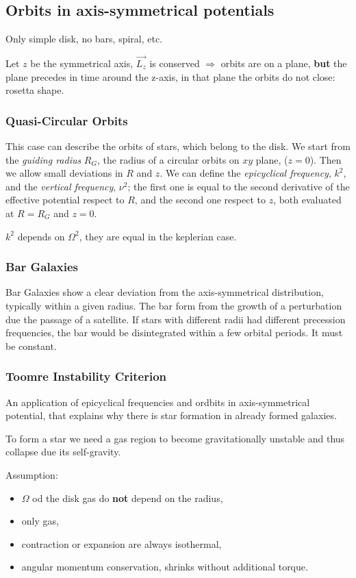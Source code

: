 \documentclass[a4paper,12pt]{article}
\begin{document}
\subsection{Orbits in axis-symmetrical potentials}
Only simple disk, no bars, spiral, etc.

Let $z$ be the symmetrical axis, $\vec{L_z}$ is conserved $\Rightarrow$ orbits are on a plane, \textbf{but} the plane precedes in time around the z-axis, in that plane the orbits do not close: rosetta shape. 


\subsubsection{Quasi-Circular Orbits}
This case can describe the orbits of stars, which belong to the disk. 
We start from the \textit{guiding radius} $R_G$, the radius of a circular orbits on $xy$ plane, ($z=0$). Then we allow small deviations in $R$ and $z$. We can define the \textit{epicyclical frequency}, $k^2$, and the \textit{vertical frequency}, $\nu^2$; the first one is equal to the second derivative of the effective potential respect to $R$, and the second one respect to $z$, both evaluated at $R=R_G$ and $z=0$.

$k^2$ depends on $\Omega^2$, they are equal in the keplerian case.



\subsubsection{Bar Galaxies}
Bar Galaxies show a clear deviation from the axis-symmetrical distribution, typically within a given radius. The bar form from the growth of a perturbation due the passage of a satellite. If stars with different radii had different precession frequencies, the bar would be disintegrated within a few orbital periods. It must be constant. 

\subsubsection{Toomre Instability Criterion}
An application of epicyclical frequencies and ordbits in axis-symmetrical potential, that explains why there is star formation in already formed galaxies.

To form a star we need a gas region to become gravitationally unstable and thus collapse due its self-gravity.
 
Assumption: 

\begin{itemize}
	\item $\Omega$ od the disk gas do \textbf{not} depend on the radius,
	\item only gas, 
	\item contraction or expansion are always isothermal,
	\item angular momentum conservation, shrinks without additional torque.
\end{itemize}
\end{document}
